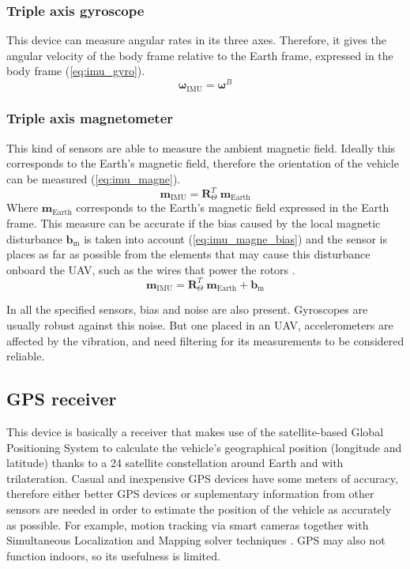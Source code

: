\documentclass[journal]{IEEEtran}
\newcommand*{\subb}[1]{_{\mathrm{#1}}}
\begin{document}
		\subsubsection{Triple axis gyroscope} This device can measure angular rates in its three axes. Therefore, it  gives the angular velocity of the body frame relative to the Earth frame, expressed in the body frame (\ref{eq:imu_gyro}).\\
		\begin{equation} \label{eq:imu_gyro}
		\bm{\omega}\subb{IMU}= \bm{\omega}^B 
		\end{equation}
		
		\subsubsection{Triple axis magnetometer} This kind of sensors are able to measure the ambient magnetic field. Ideally this corresponds to the Earth's magnetic field, therefore the orientation of the vehicle can be measured (\ref{eq:imu_magne}).
		\begin{equation} \label{eq:imu_magne}
		\bm{m}\subb{IMU}= \bm{R}^T_\Theta \  \bm{m}\subb{Earth}
		\end{equation}
		Where $\bm{m}\subb{Earth}$ corresponds to the Earth's magnetic field expressed in the Earth frame. This measure can be accurate if the bias caused by the local magnetic disturbance $\bm{b}\subb{m}$ is taken into account (\ref{eq:imu_magne_bias}) and the sensor is places as far as possible from the elements that may cause this disturbance onboard the UAV, such as the wires that power the rotors \cite{modelling_control_mahony}.
		\begin{equation} \label{eq:imu_magne_bias}
		\bm{m}\subb{IMU}= \bm{R}^T_\Theta \  \bm{m}\subb{Earth} + \bm{b}\subb{m}
		\end{equation}
		
		In all the specified sensors, bias and noise are also present. Gyroscopes are usually robust against this noise. But one placed in an UAV, accelerometers are affected by the vibration, and need filtering for its measurements to be considered reliable.
		
		\subsection{GPS receiver}
		This device is basically a receiver that makes use of the satellite-based Global Positioning System to calculate the vehicle's geographical position (longitude and latitude) thanks to a 24 satellite constellation around Earth and with trilateration. Casual and inexpensive GPS devices have some meters of accuracy, therefore either better GPS devices or suplementary information from other sensors are needed in order to estimate the position of the vehicle as accurately as possible. For example, motion tracking via smart cameras together with Simultaneous Localization and Mapping solver techniques \cite{modelling_control_mahony}. GPS may also not function indoors, so its usefulness is limited.
		
\end{document}
